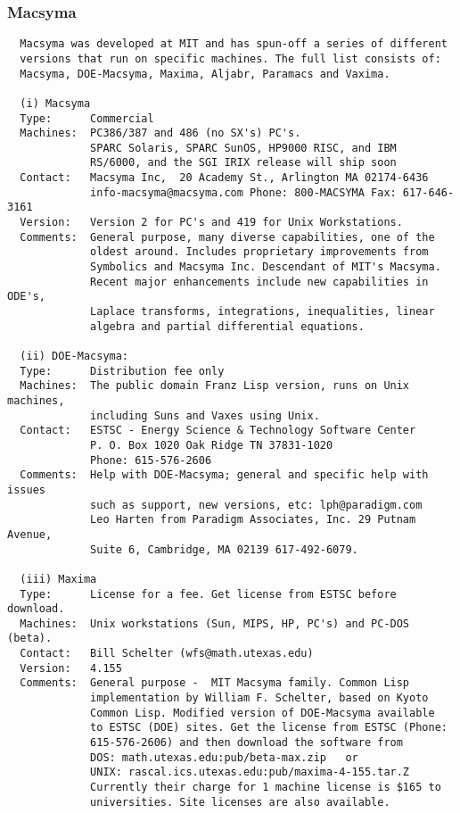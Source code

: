 \subsubsection{Macsyma}
\begin{verbatim}
  Macsyma was developed at MIT and has spun-off a series of different
  versions that run on specific machines. The full list consists of:
  Macsyma, DOE-Macsyma, Maxima, Aljabr, Paramacs and Vaxima.

  (i) Macsyma
  Type:      Commercial
  Machines:  PC386/387 and 486 (no SX's) PC's.
             SPARC Solaris, SPARC SunOS, HP9000 RISC, and IBM
             RS/6000, and the SGI IRIX release will ship soon
  Contact:   Macsyma Inc,  20 Academy St., Arlington MA 02174-6436
             info-macsyma@macsyma.com Phone: 800-MACSYMA Fax: 617-646-3161
  Version:   Version 2 for PC's and 419 for Unix Workstations.
  Comments:  General purpose, many diverse capabilities, one of the
             oldest around. Includes proprietary improvements from
             Symbolics and Macsyma Inc. Descendant of MIT's Macsyma.
             Recent major enhancements include new capabilities in ODE's,
             Laplace transforms, integrations, inequalities, linear
             algebra and partial differential equations.

  (ii) DOE-Macsyma:
  Type:      Distribution fee only
  Machines:  The public domain Franz Lisp version, runs on Unix machines,
             including Suns and Vaxes using Unix.
  Contact:   ESTSC - Energy Science & Technology Software Center
             P. O. Box 1020 Oak Ridge TN 37831-1020
             Phone: 615-576-2606
  Comments:  Help with DOE-Macsyma; general and specific help with issues
             such as support, new versions, etc: lph@paradigm.com
             Leo Harten from Paradigm Associates, Inc. 29 Putnam Avenue,
             Suite 6, Cambridge, MA 02139 617-492-6079.

  (iii) Maxima
  Type:      License for a fee. Get license from ESTSC before download.
  Machines:  Unix workstations (Sun, MIPS, HP, PC's) and PC-DOS (beta).
  Contact:   Bill Schelter (wfs@math.utexas.edu)
  Version:   4.155
  Comments:  General purpose -  MIT Macsyma family. Common Lisp
             implementation by William F. Schelter, based on Kyoto
             Common Lisp. Modified version of DOE-Macsyma available
             to ESTSC (DOE) sites. Get the license from ESTSC (Phone:
             615-576-2606) and then download the software from
             DOS: math.utexas.edu:pub/beta-max.zip   or
             UNIX: rascal.ics.utexas.edu:pub/maxima-4-155.tar.Z
             Currently their charge for 1 machine license is $165 to
             universities. Site licenses are also available.


\end{verbatim}
